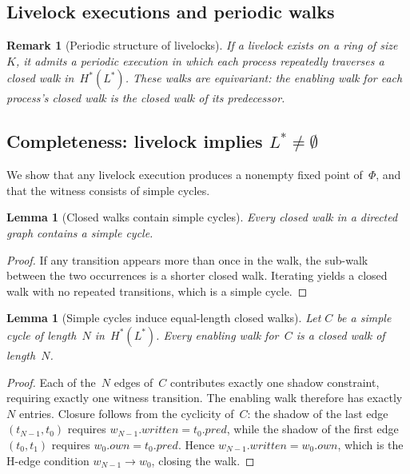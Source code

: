 \documentclass{article}
\newtheorem{lemma}[theorem]{Lemma}
\newtheorem{remark}{Remark}
\newcommand{\Hstar}{H^{*}}
\newcommand{\Lstar}{L^{*}}
\begin{document}
\subsection{Livelock executions and periodic walks}

\begin{remark}[Periodic structure of livelocks]\label{rem:periodic}
If a livelock exists on a ring of size~$K$, it admits
a periodic execution in which each process repeatedly
traverses a closed walk in~$\Hstar(\Lstar)$.
These walks are \emph{equivariant}: the enabling walk for
each process's closed walk is the closed walk of its
predecessor.
\end{remark}

\subsection{Completeness: livelock implies
\texorpdfstring{$\Lstar \neq \emptyset$}{L* nonempty}}

We show that any livelock execution produces a nonempty
fixed point of~$\Phi$, and that the witness consists of
simple cycles.

\begin{lemma}[Closed walks contain simple cycles]
\label{lem:decompose}
Every closed walk in a directed graph contains a simple cycle.
\end{lemma}

\begin{proof}
If any transition appears more than once in the walk, the
sub-walk between the two occurrences is a shorter closed walk.
Iterating yields a closed walk with no repeated transitions,
which is a simple cycle.
\end{proof}

\begin{lemma}[Simple cycles induce equal-length closed walks]
\label{lem:equal-length}
Let $C$ be a simple cycle of length~$N$ in~$\Hstar(\Lstar)$.
Every enabling walk for~$C$ is a closed walk of length~$N$.
\end{lemma}

\begin{proof}
Each of the~$N$ edges of~$C$ contributes exactly one shadow
constraint, requiring exactly one witness transition.
The enabling walk therefore has exactly~$N$ entries.
Closure follows from the cyclicity of~$C$:
the shadow of the last edge $(t_{N-1}, t_0)$ requires
$w_{N-1}.\mathit{written} = t_0.\mathit{pred}$,
while the shadow of the first edge $(t_0, t_1)$ requires
$w_0.\mathit{own} = t_0.\mathit{pred}$.
Hence $w_{N-1}.\mathit{written} = w_0.\mathit{own}$,
which is the H-edge condition $w_{N-1} \to w_0$,
closing the walk.
\end{proof}
\end{document}
